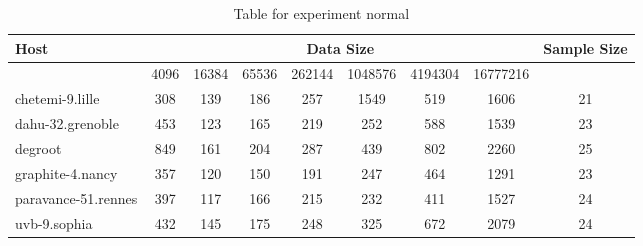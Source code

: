 \begin{table}
\caption{Table for experiment normal}
\begin{tabular}{@{}lcccccccc@{}}
\toprule
Host    & \multicolumn{7}{c}{Data Size}          & Sample Size \\ \midrule
& 4096  & 16384  & 65536  & 262144  & 1048576  & 4194304  & 16777216              \\ \midrule
chetemi-9.lille  & 308  & 139  & 186  & 257  & 1549  & 519  & 1606  & 21 \\
dahu-32.grenoble  & 453  & 123  & 165  & 219  & 252  & 588  & 1539  & 23 \\
degroot  & 849  & 161  & 204  & 287  & 439  & 802  & 2260  & 25 \\
graphite-4.nancy  & 357  & 120  & 150  & 191  & 247  & 464  & 1291  & 23 \\
paravance-51.rennes  & 397  & 117  & 166  & 215  & 232  & 411  & 1527  & 24 \\
uvb-9.sophia  & 432  & 145  & 175  & 248  & 325  & 672  & 2079  & 24 \\
\bottomrule
\end{tabular}
\end{table}